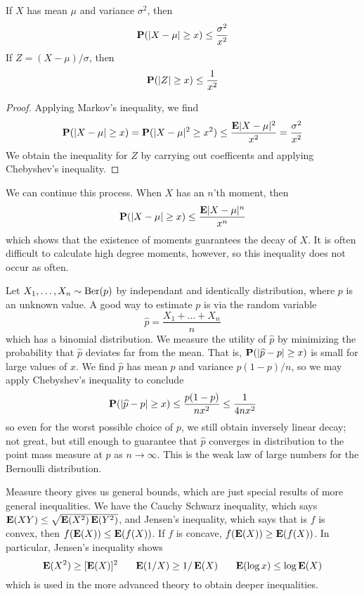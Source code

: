 \begin{theorem}
    If $X$ has mean $\mu$ and variance $\sigma^2$, then
    \[ \operatorname{\mathbf{P}}(|X - \mu| \geq x) \leq \frac{\sigma^2}{x^2} \]
    If $Z = (X - \mu)/\sigma$, then
    \[ \operatorname{\mathbf{P}}(|Z| \geq x) \leq \frac{1}{x^2} \]
\end{theorem}
\begin{proof}
    Applying Markov's inequality, we find
    \[ \operatorname{\mathbf{P}}(|X - \mu| \geq x) = \operatorname{\mathbf{P}}(|X - \mu|^2 \geq x^2) \leq \frac{\mathbf{E}|X - \mu|^2}{x^2} = \frac{\sigma^2}{x^2} \]
    We obtain the inequality for $Z$ by carrying out coefficents and applying Chebyshev's inequality.
\end{proof}

We can continue this process. When $X$ has an $n$'th moment, then
%
\[ \operatorname{\mathbf{P}}(|X - \mu| \geq x) \leq \frac{\mathbf{E}|X - \mu|^n}{x^n} \]
%
which shows that the existence of moments guarantees the decay of $X$. It is often difficult to calculate high degree moments, however, so this inequality does not occur as often.

\begin{example}
    Let $X_1, \dots, X_n \sim \operatorname{\text{Ber}}(p)$ by independant and identically distribution, where $p$ is an unknown value. A good way to estimate $p$ is via the random variable
    \[ \widehat{p} = \frac{X_1 + \dots + X_n}{n} \]
    which has a binomial distribution. We measure the utility of $\widehat{p}$ by minimizing the probability that $\widehat{p}$ deviates far from the mean. That is, $\operatorname{\mathbf{P}}(|\widehat{p} - p| \geq x)$ is small for large values of $x$. We find $\widehat{p}$ has mean $p$ and variance $p(1-p)/n$, so we may apply Chebyshev's inequality to conclude
    \[ \operatorname{\mathbf{P}}(|\widehat{p} - p| \geq x) \leq \frac{p(1-p)}{nx^2} \leq \frac{1}{4nx^2} \]
    so even for the worst possible choice of $p$, we still obtain inversely linear decay; not great, but still enough to guarantee that $\widehat{p}$ converges in distribution to the point mass measure at $p$ as $n \to \infty$. This is the weak law of large numbers for the Bernoulli distribution.
\end{example}

Measure theory gives us general bounds, which are just special results of more general inequalities. We have the Cauchy Schwarz inequality, which says $\operatorname{\mathbf{E}}(XY) \leq \sqrt{\operatorname{\mathbf{E}}(X^2) \operatorname{\mathbf{E}}(Y^2)}$, and Jensen's inequality, which says that is $f$ is convex, then $f(\operatorname{\mathbf{E}}(X)) \leq \operatorname{\mathbf{E}}(f(X))$. If $f$ is concave, $f(\operatorname{\mathbf{E}}(X)) \geq \operatorname{\mathbf{E}}(f(X))$. In particular, Jensen's inequality shows
%
\[ \Expect(X^2) \geq [\Expect(X)]^2\ \ \ \ \ \Expect(1/X) \geq 1/\Expect(X)\ \ \ \ \ \Expect(\log x) \leq \log \Expect(X) \]
%
which is used in the more advanced theory to obtain deeper inequalities.

